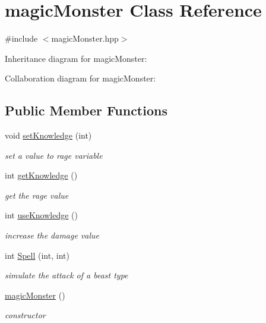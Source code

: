 \hypertarget{classmagicMonster}{}\section{magic\+Monster Class Reference}
\label{classmagicMonster}


{\ttfamily \#include $<$magic\+Monster.\+hpp$>$}



Inheritance diagram for magic\+Monster\+:


Collaboration diagram for magic\+Monster\+:
\subsection*{Public Member Functions}
\begin{DoxyCompactItemize}
\item 
void \hyperlink{classmagicMonster_a5e8bd2c96435a180d39d33ce8786254f}{set\+Knowledge} (int)
\begin{DoxyCompactList}\small\item\em set a value to rage variable \end{DoxyCompactList}\item 
int \hyperlink{classmagicMonster_af136d23ce2a8b2bb2197ff3ff23636a3}{get\+Knowledge} ()
\begin{DoxyCompactList}\small\item\em get the rage value \end{DoxyCompactList}\item 
int \hyperlink{classmagicMonster_af63bf931d677fc2f7729960a4457fda9}{use\+Knowledge} ()
\begin{DoxyCompactList}\small\item\em increase the damage value \end{DoxyCompactList}\item 
int \hyperlink{classmagicMonster_a0f7f94eaeec3af30f581d58dc95272a8}{Spell} (int, int)
\begin{DoxyCompactList}\small\item\em simulate the attack of a beast type \end{DoxyCompactList}\item 
\hyperlink{classmagicMonster_ac9cb1ef18b66d42ca4f43ae19e31ef50}{magic\+Monster} ()
\begin{DoxyCompactList}\small\item\em constructor \end{DoxyCompactList}\end{DoxyCompactItemize}
